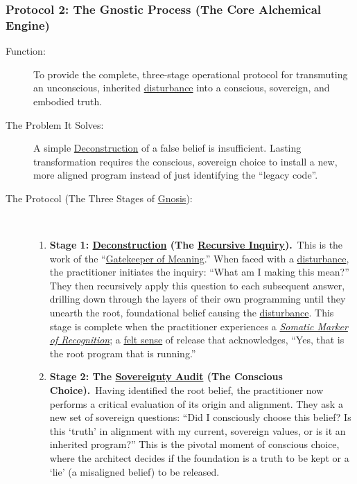 \documentclass{article}
\begin{document}
\subsubsection*{Protocol 2: The Gnostic Process (The Core Alchemical Engine)}
\begin{description}
    \item[Function:] To provide the complete, three-stage operational protocol for transmuting an unconscious, inherited \hyperlink{gloss:disturbance}{disturbance} into a conscious, sovereign, and embodied truth.
    \item[The Problem It Solves:] A simple \hyperlink{gloss:deconstruction}{Deconstruction} of a false belief is insufficient. Lasting transformation requires the conscious, sovereign choice to install a new, more aligned program instead of just identifying the ``legacy code''.
    \item[The Protocol (The Three Stages of \hyperlink{gloss:gnosis}{Gnosis}):]~
    \begin{enumerate}[label={}]
        \item \textbf{Stage 1: \hyperlink{gloss:deconstruction}{Deconstruction} (The \hyperlink{gloss:recursive_inquiry}{Recursive Inquiry}).}~\newline\newline This is the work of the ``\hyperlink{gloss:gatekeeper_of_meaning}{Gatekeeper of Meaning}.'' When faced with a \hyperlink{gloss:disturbance}{disturbance}, the practitioner initiates the inquiry: ``What am I making this mean?'' They then recursively apply this question to each subsequent answer, drilling down through the layers of their own programming until they unearth the root, foundational belief causing the \hyperlink{gloss:disturbance}{disturbance}. This stage is complete when the practitioner experiences a \textit{\hyperlink{gloss:somatic_marker_of_recognition}{Somatic Marker of Recognition}}; a \hyperlink{gloss:felt_sense}{felt sense} of release that acknowledges, ``Yes, that is the root program that is running.''
        \newline 
        \item \textbf{Stage 2: The \hyperlink{gloss:sovereignty_audit}{Sovereignty Audit} (The Conscious Choice).}~\newline\newline Having identified the root belief, the practitioner now performs a critical evaluation of its origin and alignment. They ask a new set of sovereign questions: ``Did I consciously choose this belief? Is this `truth' in alignment with my current, sovereign values, or is it an inherited program?'' This is the pivotal moment of conscious choice, where the architect decides if the foundation is a truth to be kept or a `lie' (a misaligned belief) to be released.

\end{enumerate}
\end{description}
\end{document}
